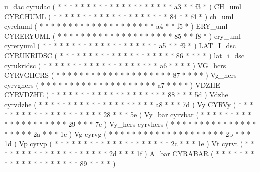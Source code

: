 \makecod u_dac        cyrudac           ( *  *       *  *   *  *  *  *     *  *  *  *  *     *  *  *  *     *  *  *     a3  *  *    f3 *   )
\makeCOD CH_uml       CYRCHUML          ( *  *       *  *   *  *  *  *     *  *  *  *  *     *  *  *  *     *  *  *     84  *  *    f4 *   )
\makecod ch_uml       cyrchuml          ( *  *       *  *   *  *  *  *     *  *  *  *  *     *  *  *  *     *  *  *     a4  *  *    f5 *   )
\makeCOD ERY_uml      CYRERYUML         ( *  *       *  *   *  *  *  *     *  *  *  *  *     *  *  *  *     *  *  *     85  *  *    f8 *   )
\makecod ery_uml      cyreryuml         ( *  *       *  *   *  *  *  *     *  *  *  *  *     *  *  *  *     *  *  *     a5  *  *    f9 *   )
\makeCOD LAT_I_dsc    CYRUKRIDSC        ( *  *       *  *   *  *  *  *     *  *  *  *  *     *  *  *  *     *  *  *     86  *  *    *  *   )
\makecod lat_i_dsc    cyrukridsc        ( *  *       *  *   *  *  *  *     *  *  *  *  *     *  *  *  *     *  *  *     a6  *  *    *  *   )
\makeCOD VG_hcrs      CYRVGHCRS         ( *  *       *  *   *  *  *  *     *  *  *  *  *     *  *  *  *     *  *  *     87  *  *    *  *   )
\makecod Vg_hcrs      cyrvghcrs         ( *  *       *  *   *  *  *  *     *  *  *  *  *     *  *  *  *     *  *  *     a7  *  *    *  *   )
\makeCOD VDZHE        CYRVDZHE          ( *  *       *  *   *  *  *  *     *  *  *  *  *     *  *  *  *     *  *  *     88  *  *    *  5d  )
\makecod Vdzhe        cyrvdzhe          ( *  *       *  *   *  *  *  *     *  *  *  *  *     *  *  *  *     *  *  *     a8  *  *    *  7d  )
%
\makechr Vy           CYRVy             ( *  *       *  *   *  *  *  *     *  *  *  *  *     *  *  *  *     *  *  *     28  *  *    *  5e  )
\makechr Vy_bar       cyrvbar           ( *  *       *  *   *  *  *  *     *  *  *  *  *     *  *  *  *     *  *  *     29  *  *    *  7e  )
\makechr Vy_hcrs      cyrvhcrs          ( *  *       *  *   *  *  *  *     *  *  *  *  *     *  *  *  *     *  *  *     2a  *  *    *  1c  )
\makechr Vg           cyrvg             ( *  *       *  *   *  *  *  *     *  *  *  *  *     *  *  *  *     *  *  *     2b  *  *    *  1d  )
\makechr Vp           cyrvp             ( *  *       *  *   *  *  *  *     *  *  *  *  *     *  *  *  *     *  *  *     2c  *  *    *  1e  )
\makechr Vt           cyrvt             ( *  *       *  *   *  *  *  *     *  *  *  *  *     *  *  *  *     *  *  *     2d  *  *    *  1f  )
\makeCOD A_bar        CYRABAR           ( *  *       *  *   *  *  *  *     *  *  *  *  *     *  *  *  *     *  *  *     89  *  *    *  *   )
